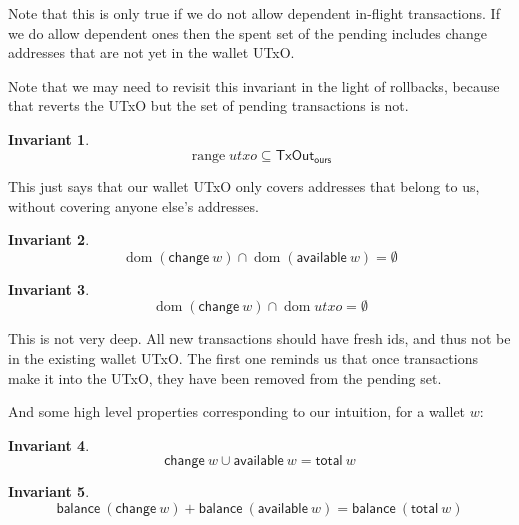 \documentclass{article}
\DeclareMathOperator{\dom}{dom}
\DeclareMathOperator{\range}{range}
\newtheorem{invariant}{Invariant}
\begin{document}
Note that this is only true if we do not allow dependent in-flight transactions.
If we do allow dependent ones then the spent set of the pending includes change
addresses that are not yet in the wallet UTxO.

Note that we may need to revisit this invariant in the light of rollbacks,
because that reverts the UTxO but the set of pending transactions is not.

\begin{invariant}
\begin{equation*}
\range utxo \subseteq \mathsf{TxOut_{ours}}
\end{equation*}
\label{inv:utxo_is_ours}
\end{invariant}

This just says that our wallet UTxO only covers addresses that belong to us,
without covering anyone else's addresses.

\begin{invariant}
\begin{equation*}
\dom (\mathsf{change} ~ w) \cap \dom (\mathsf{available} ~ w) = \emptyset
\end{equation*}
\label{inv:change_vs_available}
\end{invariant}

\begin{invariant}
\begin{equation*}
\dom (\mathsf{change} ~ w) \cap \dom utxo = \emptyset
\end{equation*}
\label{inv:change_vs_utxo}
\end{invariant}

This is not very deep. All new transactions should have fresh ids, and thus
not be in the existing wallet UTxO. The first one reminds us that once
transactions make it into the UTxO, they have been removed from the pending set.

And some high level properties corresponding to our intuition, for a wallet $w$:

\begin{invariant}
\begin{equation*}
\mathsf{change} ~ w \cup \mathsf{available} ~ w = \mathsf{total} ~ w
\end{equation*}
\label{inv:change_union_available}
\end{invariant}

\begin{invariant}
\begin{equation*}
\mathsf{balance} ~ (\mathsf{change} ~ w) + \mathsf{balance} ~ (\mathsf{available} ~ w) = \mathsf{balance} ~ (\mathsf{total} ~ w)
\end{equation*}
\label{inv:balance_change_available}
\end{invariant}
\end{document}
